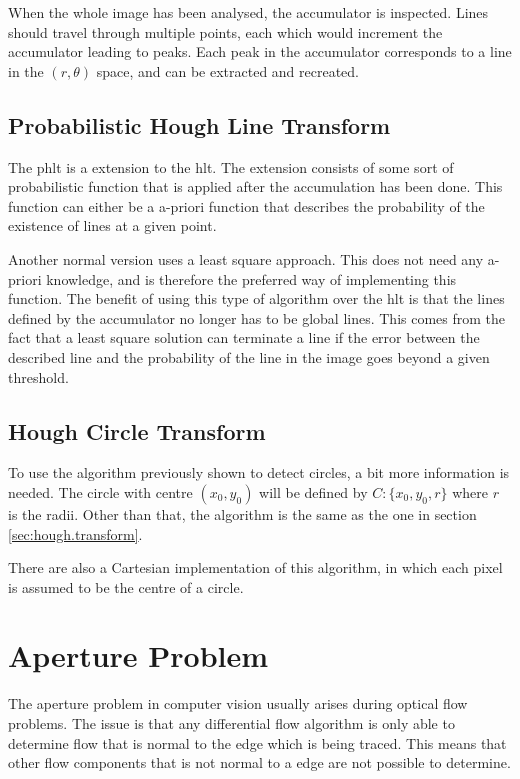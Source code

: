 When the whole image has been analysed, the accumulator is inspected. Lines should travel through multiple points, 
each which would increment the accumulator leading to peaks. Each peak in the accumulator corresponds to 
a line in the $(r, \theta)$ space, and can be extracted and recreated.

\subsection{Probabilistic Hough Line Transform}
The \gls{phlt} is a extension to the \gls{hlt}. The extension consists of 
some sort of probabilistic function that is applied after the accumulation has been done. This 
function can either be a a-priori function 
that describes the probability of the existence of lines at a given point. 

Another 
normal version uses a least square approach. This does not need any a-priori knowledge,
and is therefore the preferred way of implementing this function. The 
benefit of using this type of algorithm over the \gls{hlt} is that 
the lines defined by the accumulator no longer has to be global lines. This 
comes from the fact that a least square solution can terminate a line if the error between the described 
line and the probability of the line in the image goes beyond a given threshold. 


\subsection{Hough Circle Transform}\label{sec:hough.circles}
To use the algorithm previously shown to detect circles, a bit more information is needed. 
The circle with centre $(x_0,y_0)$ will be defined by $C:\{x_0,y_0,r\}$ where $r$ is the radii.
Other than that, the algorithm is the same as the one in section \vref{sec:hough.transform}.

There are also a Cartesian implementation of this algorithm, in which each pixel is assumed to 
be the centre of a circle. 


\section{Aperture Problem}\label{sec:aperture.problem}
The aperture problem in computer vision usually arises during optical flow problems. The issue is that 
any differential flow algorithm is only able to determine flow that is normal to the edge which is being traced.
This means that other flow components that is not normal to a edge are not possible to determine.

